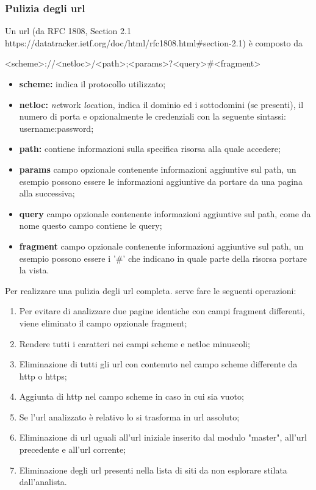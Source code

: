\subsubsection{Pulizia degli url}
Un url (da RFC 1808, Section 2.1 https://datatracker.ietf.org/doc/html/rfc1808.html\#section-2.1) è composto da \newline
\centerline{<scheme>://<netloc>/<path>;<params>?<query>\#<fragment>}
\newline
\begin{itemize}
	\item \textbf{scheme:} indica il protocollo utilizzato;
	\item \textbf{netloc:} \textit{ne}twork \textit{loc}ation, indica il dominio ed i sottodomini (se presenti), il numero di porta e opzionalmente le credenziali con la seguente sintassi: username:password;
	\item \textbf{path:} contiene informazioni sulla specifica risorsa alla quale accedere;
	\item \textbf{params} campo opzionale contenente informazioni aggiuntive sul path, un esempio possono essere le informazioni aggiuntive da portare da una pagina alla successiva;
	\item \textbf{query} campo opzionale contenente informazioni aggiuntive sul path, come da nome questo campo contiene le query;
	\item \textbf{fragment} campo opzionale contenente informazioni aggiuntive sul path, un esempio possono essere i '\#' che indicano in quale parte della risorsa portare la vista.
\end{itemize}

Per realizzare una pulizia degli url completa. serve fare le seguenti operazioni:
\begin{enumerate}
	\item Per evitare di analizzare due pagine identiche con campi fragment differenti, viene eliminato il campo opzionale fragment;
	\item Rendere tutti i caratteri nei campi scheme e netloc minuscoli;
	\item Eliminazione di tutti gli url con contenuto nel campo scheme differente da http o https;
	\item Aggiunta di http nel campo scheme in caso in cui sia vuoto;
	\item Se l'url analizzato è relativo lo si trasforma in url assoluto;
	\item Eliminazione di url uguali all'url iniziale inserito dal modulo "master", all'url precedente e all'url corrente;
	\item Eliminazione degli url presenti nella lista di siti da non esplorare stilata dall'analista.
\end{enumerate}

